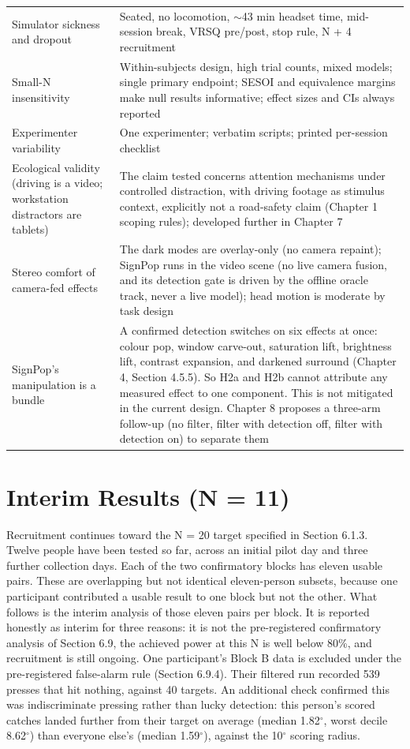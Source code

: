 \begin{longtable}{p{}|p{}}
Simulator sickness and dropout & Seated, no locomotion, $\sim$43 min headset time, mid-session break, VRSQ pre/post, stop rule, N + 4 recruitment \\
Small-N insensitivity & Within-subjects design, high trial counts, mixed models; single primary endpoint; SESOI and equivalence margins make null results informative; effect sizes and CIs always reported \\
Experimenter variability & One experimenter; verbatim scripts; printed per-session checklist \\
Ecological validity (driving is a video; workstation distractors are tablets) & The claim tested concerns attention mechanisms under controlled distraction, with driving footage as stimulus context, explicitly not a road-safety claim (Chapter 1 scoping rules); developed further in Chapter 7 \\
Stereo comfort of camera-fed effects & The dark modes are overlay-only (no camera repaint); SignPop runs in the video scene (no live camera fusion, and its detection gate is driven by the offline oracle track, never a live model); head motion is moderate by task design \\
SignPop's manipulation is a bundle & A confirmed detection switches on six effects at once: colour pop, window carve-out, saturation lift, brightness lift, contrast expansion, and darkened surround (Chapter 4, Section 4.5.5). So H2a and H2b cannot attribute any measured effect to one component. This is not mitigated in the current design. Chapter 8 proposes a three-arm follow-up (no filter, filter with detection off, filter with detection on) to separate them \\
\hline
\end{longtable}

\section{Interim Results (N = 11)}

Recruitment continues toward the N = 20 target specified in Section 6.1.3. Twelve people have been
tested so far, across an initial pilot day and three further collection days. Each of the two
confirmatory blocks has eleven usable pairs. These are overlapping but not identical eleven-person
subsets, because one participant contributed a usable result to one block but not the other. What
follows is the interim analysis of those eleven pairs per block. It is reported honestly as interim
for three reasons: it is not the pre-registered confirmatory analysis of Section 6.9, the achieved
power at this N is well below 80\%, and recruitment is still ongoing. One participant's Block B data
is excluded under the pre-registered false-alarm rule (Section 6.9.4). Their filtered run recorded
539 presses that hit nothing, against 40 targets. An additional check confirmed this was
indiscriminate pressing rather than lucky detection: this person's scored catches landed further from
their target on average (median 1.82$^{\circ}$, worst decile 8.62$^{\circ}$) than everyone else's (median
1.59$^{\circ}$), against the 10$^{\circ}$ scoring radius.

